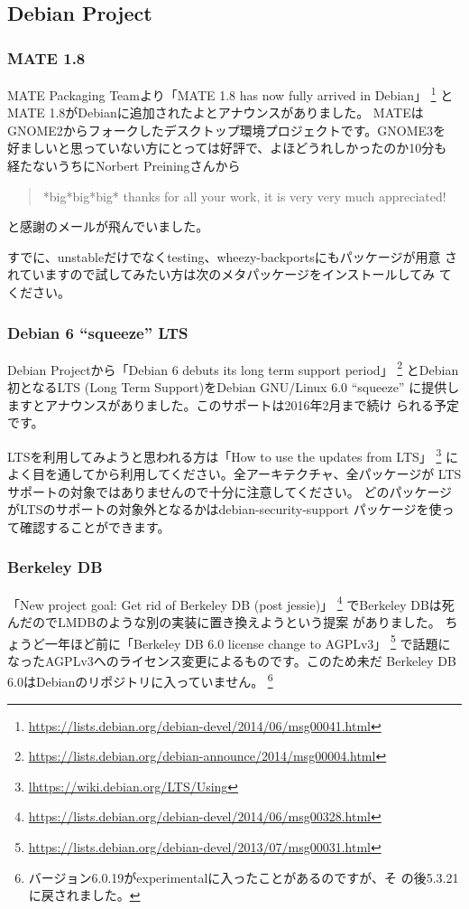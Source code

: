 \documentclass[mingoth,a4paper]{jsarticle}
\begin{document}
\subsection{Debian Project}

\subsubsection{MATE 1.8}
MATE Packaging Teamより「MATE 1.8 has now fully arrived in Debian」
\footnote{\url{https://lists.debian.org/debian-devel/2014/06/msg00041.html}}
とMATE 1.8がDebianに追加されたよとアナウンスがありました。
MATEはGNOME2からフォークしたデスクトップ環境プロジェクトです。GNOME3を
好ましいと思っていない方にとっては好評で、よほどうれしかったのか10分も
経たないうちにNorbert Preiningさんから
\begin{quote}
  *big*big*big* thanks for all your work, it is very very much appreciated!
\end{quote}
と感謝のメールが飛んでいました。

すでに、unstableだけでなくtesting、wheezy-backportsにもパッケージが用意
されていますので試してみたい方は次のメタパッケージをインストールしてみ
てください。

\subsubsection{Debian 6 ``squeeze'' LTS}
Debian Projectから「Debian 6 debuts its long term support period」
\footnote{\url{https://lists.debian.org/debian-announce/2014/msg00004.html}}
とDebian初となるLTS (Long Term Support)をDebian GNU/Linux 6.0 ``squeeze''
に提供しますとアナウンスがありました。このサポートは2016年2月まで続け
られる予定です。

LTSを利用してみようと思われる方は「How to use the updates from LTS」
\footnote{\url{lhttps://wiki.debian.org/LTS/Using}}
によく目を通してから利用してください。全アーキテクチャ、全パッケージが
LTSサポートの対象ではありませんので十分に注意してください。
どのパッケージがLTSのサポートの対象外となるかはdebian-security-support
パッケージを使って確認することができます。

\subsubsection{Berkeley DB}
「New project goal: Get rid of Berkeley DB (post jessie)」
\footnote{\url{https://lists.debian.org/debian-devel/2014/06/msg00328.html}}
でBerkeley DBは死んだのでLMDBのような別の実装に置き換えようという提案
がありました。
ちょうど一年ほど前に「Berkeley DB 6.0 license change to AGPLv3」
\footnote{\url{https://lists.debian.org/debian-devel/2013/07/msg00031.html}}
で話題になったAGPLv3へのライセンス変更によるものです。このため未だ
Berkeley DB 6.0はDebianのリポジトリに入っていません。
\footnote{バージョン6.0.19がexperimentalに入ったことがあるのですが、そ
の後5.3.21に戻されました。}
\end{document}
